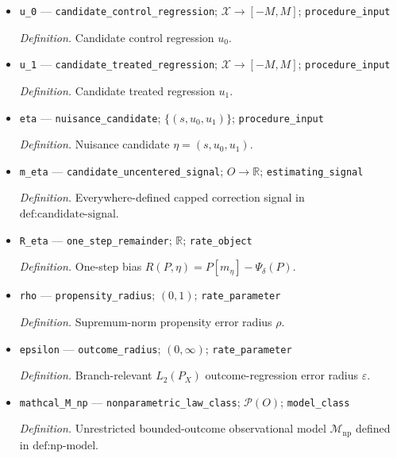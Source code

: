 \documentclass{article}
\begin{document}
\begin{itemize}
  \item \texttt{u\_\allowbreak{}0} --- \texttt{candidate\_\allowbreak{}control\_\allowbreak{}regression}; \(\mathcal X\to[-M,M]\); \texttt{procedure\_\allowbreak{}input}
  \par\smallskip\noindent\emph{Definition.} Candidate control regression \(u_0\).
  \item \texttt{u\_\allowbreak{}1} --- \texttt{candidate\_\allowbreak{}treated\_\allowbreak{}regression}; \(\mathcal X\to[-M,M]\); \texttt{procedure\_\allowbreak{}input}
  \par\smallskip\noindent\emph{Definition.} Candidate treated regression \(u_1\).
  \item \texttt{eta} --- \texttt{nuisance\_\allowbreak{}candidate}; \(\{(s,u_0,u_1)\}\); \texttt{procedure\_\allowbreak{}input}
  \par\smallskip\noindent\emph{Definition.} Nuisance candidate \(\eta=(s,u_0,u_1)\).
  \item \texttt{m\_\allowbreak{}eta} --- \texttt{candidate\_\allowbreak{}uncentered\_\allowbreak{}signal}; \(O\to\mathbb R\); \texttt{estimating\_\allowbreak{}signal}
  \par\smallskip\noindent\emph{Definition.} Everywhere-defined capped correction signal in \(\text{def:candidate-signal}\).
  \item \texttt{R\_\allowbreak{}eta} --- \texttt{one\_\allowbreak{}step\_\allowbreak{}remainder}; \(\mathbb R\); \texttt{rate\_\allowbreak{}object}
  \par\smallskip\noindent\emph{Definition.} One-step bias \(R(P,\eta)=P[m_\eta]-\Psi_\delta(P)\).
  \item \texttt{rho} --- \texttt{propensity\_\allowbreak{}radius}; \((0,1)\); \texttt{rate\_\allowbreak{}parameter}
  \par\smallskip\noindent\emph{Definition.} Supremum-norm propensity error radius \(\rho\).
  \item \texttt{epsilon} --- \texttt{outcome\_\allowbreak{}radius}; \((0,\infty)\); \texttt{rate\_\allowbreak{}parameter}
  \par\smallskip\noindent\emph{Definition.} Branch-relevant \(L_2(P_X)\) outcome-regression error radius \(\varepsilon\).
  \item \texttt{mathcal\_\allowbreak{}M\_\allowbreak{}np} --- \texttt{nonparametric\_\allowbreak{}law\_\allowbreak{}class}; \(\mathcal P(O)\); \texttt{model\_\allowbreak{}class}
  \par\smallskip\noindent\emph{Definition.} Unrestricted bounded-outcome observational model \(\mathcal M_{\mathrm{np}}\) defined in \(\text{def:np-model}\).

\end{itemize}
\end{document}
